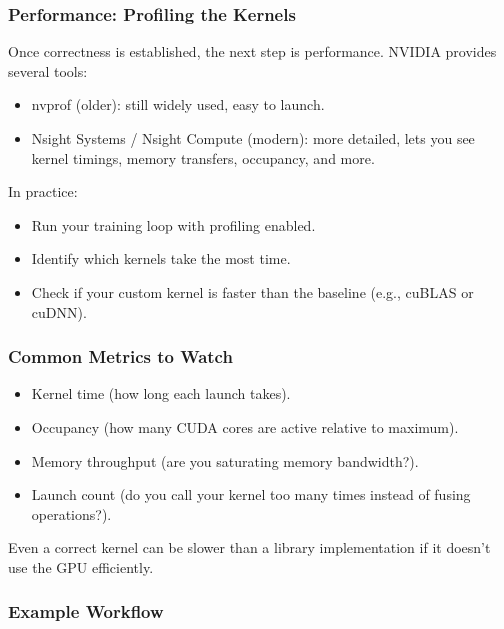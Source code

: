 \documentclass[
  letterpaper,
  DIV=11,
  numbers=noendperiod]{scrreprt}
\providecommand{\tightlist}{%
  \setlength{\itemsep}{0pt}\setlength{\parskip}{0pt}}
\begin{document}
\subsubsection{Performance: Profiling the
Kernels}\label{performance-profiling-the-kernels}

Once correctness is established, the next step is performance. NVIDIA
provides several tools:

\begin{itemize}
\tightlist
\item
  nvprof (older): still widely used, easy to launch.
\item
  Nsight Systems / Nsight Compute (modern): more detailed, lets you see
  kernel timings, memory transfers, occupancy, and more.
\end{itemize}

In practice:

\begin{itemize}
\tightlist
\item
  Run your training loop with profiling enabled.
\item
  Identify which kernels take the most time.
\item
  Check if your custom kernel is faster than the baseline (e.g., cuBLAS
  or cuDNN).
\end{itemize}

\subsubsection{Common Metrics to Watch}\label{common-metrics-to-watch}

\begin{itemize}
\tightlist
\item
  Kernel time (how long each launch takes).
\item
  Occupancy (how many CUDA cores are active relative to maximum).
\item
  Memory throughput (are you saturating memory bandwidth?).
\item
  Launch count (do you call your kernel too many times instead of fusing
  operations?).
\end{itemize}

Even a correct kernel can be slower than a library implementation if it
doesn't use the GPU efficiently.

\subsubsection{Example Workflow}\label{example-workflow-1}
\end{document}
